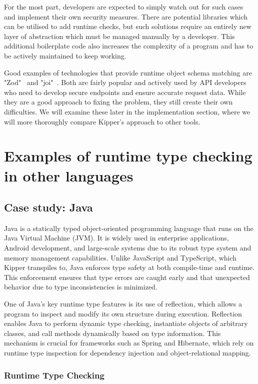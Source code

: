 For the most part, developers are expected to simply watch out for such cases and implement their own security measures. There are potential libraries which can be utilised to add runtime checks, but such solutions require an entirely new layer of abstraction which must be managed manually by a developer. This additional boilerplate code also increases the complexity of a program and has to be actively maintained to keep working.

Good examples of technologies that provide runtime object schema matching are "Zod"~\cite{zod} and "joi"~\cite{joi}. Both are fairly popular and actively used by API developers who need to develop secure endpoints and ensure accurate request data. While they are a good approach to fixing the problem, they still create their own difficulties. We will examine these later in the implementation section, where we will more thoroughly compare Kipper's approach to other tools.

\section{Examples of runtime type checking in other languages}

\subsection{Case study: Java}

Java is a statically typed object-oriented programming language that runs on the Java Virtual Machine (JVM). It is widely used in enterprise applications, Android development, and large-scale systems due to its robust type system and memory management capabilities. Unlike JavaScript and TypeScript, which Kipper transpiles to, Java enforces type safety at both compile-time and runtime. This enforcement ensures that type errors are caught early and that unexpected behavior due to type inconsistencies is minimized.

One of Java’s key runtime type features is its use of 	reflection, which allows a program to inspect and modify its own structure during execution. Reflection enables Java to perform dynamic type checking, instantiate objects of arbitrary classes, and call methods dynamically based on type information. This mechanism is crucial for frameworks such as Spring and Hibernate, which rely on runtime type inspection for dependency injection and object-relational mapping.

\subsubsection{Runtime Type Checking}

